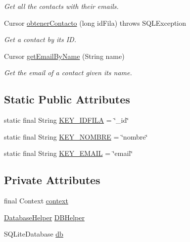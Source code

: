 \begin{DoxyCompactItemize}
\begin{DoxyCompactList}\small\item\em Get all the contacts with their emails. \end{DoxyCompactList}\item 
Cursor \hyperlink{classnpi_1_1practicaandroid_1_1tutorialnpi_1_1_adaptador_b_d_ae5ebb47b1a0166bbf866eda0367deae7}{obtener\-Contacto} (long id\-Fila)  throws S\-Q\-L\-Exception 
\begin{DoxyCompactList}\small\item\em Get a contact by its I\-D. \end{DoxyCompactList}\item 
Cursor \hyperlink{classnpi_1_1practicaandroid_1_1tutorialnpi_1_1_adaptador_b_d_aef7ad90990381354464ef5f7b2464930}{get\-Email\-By\-Name} (String name)
\begin{DoxyCompactList}\small\item\em Get the email of a contact given its name. \end{DoxyCompactList}\end{DoxyCompactItemize}
\subsection*{Static Public Attributes}
\begin{DoxyCompactItemize}
\item 
static final String \hyperlink{classnpi_1_1practicaandroid_1_1tutorialnpi_1_1_adaptador_b_d_aef0b2454f8965f292b6c5e1c3f3de2b1}{K\-E\-Y\-\_\-\-I\-D\-F\-I\-L\-A} = \char`\"{}\-\_\-id\char`\"{}
\item 
static final String \hyperlink{classnpi_1_1practicaandroid_1_1tutorialnpi_1_1_adaptador_b_d_aac27fea036b6e589b6a4a8c2e3d5b596}{K\-E\-Y\-\_\-\-N\-O\-M\-B\-R\-E} = \char`\"{}nombre\char`\"{}
\item 
static final String \hyperlink{classnpi_1_1practicaandroid_1_1tutorialnpi_1_1_adaptador_b_d_a73ed6dbe79a9f13e4d84a081e10a3d3f}{K\-E\-Y\-\_\-\-E\-M\-A\-I\-L} = \char`\"{}email\char`\"{}
\end{DoxyCompactItemize}
\subsection*{Private Attributes}
\begin{DoxyCompactItemize}
\item 
final Context \hyperlink{classnpi_1_1practicaandroid_1_1tutorialnpi_1_1_adaptador_b_d_a637ed3bd130ac8715ce83832cc24635c}{context}
\item 
\hyperlink{classnpi_1_1practicaandroid_1_1tutorialnpi_1_1_database_helper}{Database\-Helper} \hyperlink{classnpi_1_1practicaandroid_1_1tutorialnpi_1_1_adaptador_b_d_ac3e24d1a7aeeb4bc0fe78f054c42752b}{D\-B\-Helper}
\item 
S\-Q\-Lite\-Database \hyperlink{classnpi_1_1practicaandroid_1_1tutorialnpi_1_1_adaptador_b_d_a7bda122c7e3ef7889ebe3f14ee6a6992}{db}
\end{DoxyCompactItemize}
